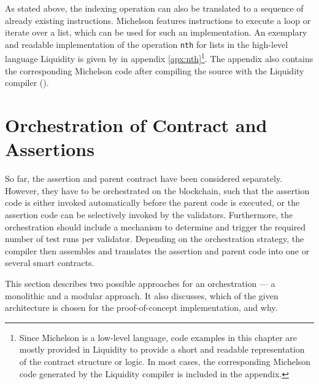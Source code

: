 As stated above, the indexing operation can also be translated to a sequence of already existing instructions. Michelson features instructions to execute a loop or iterate over a list, which can be used for such an implementation. An exemplary and readable implementation of the operation \texttt{nth} for lists in the high-level language Liquidity is given by  in appendix \ref{apx:nth}\footnote{Since Michelson is a low-level language, code examples in this chapter are mostly provided in Liquidity to provide a short and readable representation of the contract structure or logic. In most cases, the corresponding Michelson code generated by the Liquidity compiler is included in the appendix.}. The appendix also contains the corresponding Michelson code after compiling the source with the Liquidity compiler ().

\section{Orchestration of Contract and Assertions}\label{sec:orchestration}
So far, the assertion and parent contract have been considered separately. However, they have to be orchestrated on the blockchain, such that the assertion code is either invoked automatically before the parent code is executed, or the assertion code can be selectively invoked by the validators. Furthermore, the orchestration should include a mechanism to determine and trigger the required number of test runs per validator. Depending on the orchestration strategy, the compiler then assembles and translates the assertion and parent code into one or several smart contracts.

This section describes two possible approaches for an orchestration --- a monolithic and a modular approach. It also discusses, which of the given architecture is chosen for the proof-of-concept implementation, and why.

